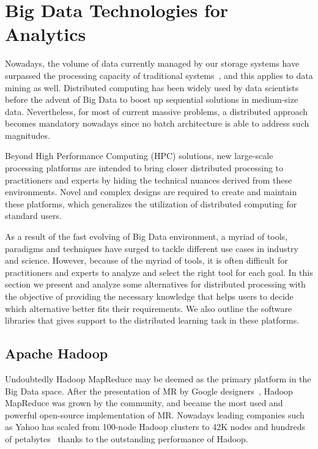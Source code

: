 \documentclass[3p,review]{elsarticle}
\begin{document}
\section{Big Data Technologies for Analytics}\label{sec:techno}


Nowadays, the volume of data currently managed by our storage systems have surpassed the processing capacity of traditional systems~\cite{wu14}, and this applies to data mining as well. Distributed computing has been widely used by data scientists before the advent of Big Data to boost up sequential solutions in medium-size data. Nevertheless, for most of current massive problems, a distributed approach becomes mandatory nowadays since no batch architecture is able to address such magnitudes.

Beyond High Performance Computing (HPC) solutions, new large-scale processing platforms are intended to bring closer distributed processing to practitioners and experts by hiding the technical nuances derived from these environments. Novel and complex designs are required to create and maintain these platforms, which generalizes the utilization of distributed computing for standard users. 

As a result of the fast evolving of Big Data environment, a myriad of tools, paradigms and techniques have surged to tackle different use cases in industry and science. However, because of the myriad of tools, it is often difficult for practitioners and experts to analyze and select the right tool for each goal. In this section we present and analyze some alternatives for distributed processing with the objective of providing the necessary knowledge that helps users to decide which alternative better fits their requirements. We also outline the software libraries that gives support to the distributed learning task in these platforms.

\subsection{Apache Hadoop}\label{subsec:hadoop}

Undoubtedly Hadoop MapReduce may be deemed as the primary platform in the Big Data space. After the presentation of MR by Google designers~\cite{dean04}, Hadoop MapReduce was grown by the community, and became the most used and powerful open-source implementation of MR. Nowadays leading companies such as Yahoo has scaled from 100-node Hadoop clusters to 42K nodes and hundreds of petabytes~\cite{harris13} thanks to the outstanding performance of Hadoop. 
\end{document}
